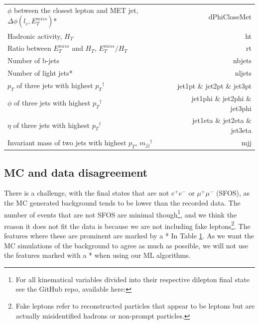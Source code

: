 \documentclass[12pt, a4paper]{book}
\begin{document}
\begin{table}[!h]
\begin{tabular}{l|r}
        $\phi$ between the closest lepton and MET jet, $\Delta\phi(l_c,E_T^{miss})$*    & dPhiCloseMet \\
        Hadronic activity, $H_T$                                                        & ht\\
        Ratio between $E_T^{miss}$ and $H_T$, $E_T^{miss}/H_T$                          & rt\\
        Number of b-jets                                                                & nbjets         \\
        Number of light jets*                                                           & nljets         \\
        $p_T$ of three jets with highest $p_T$$^\dagger$                                & jet1pt \& jet2pt \& jet3pt\\
        $\phi$ of three jets with highest $p_T$$^\dagger$                               & jet1phi \& jet2phi \& jet3phi\\
        $\eta$ of three jets with highest $p_T$$^\dagger$                               & jet1eta \& jet2eta \& jet3eta\\
        Invariant mass of two jets with highest $p_T$, $m_{jj}$$^\dagger$               & mjj\\\midrule\midrule
    \end{tabular}
    \label{tab:variables}
\end{table}

\subsection{MC and data disagreement}\label{sec:star}
There is a challenge, with the final states that are not $e^+e^-$ or $\mu^+\mu^-$ (SFOS), as the MC generated background tends to be lower than the recorded data. The number of events that are not SFOS are minimal though\footnote{For all kinematical variables divided into their respective dilepton final state see the GitHub repo, available here: }, 
and we think the reason it does not fit the data is because we are not including fake leptons\footnote{Fake leptons refer to reconstructed particles that appear to be leptons but are actually misidentified hadrons or non-prompt particles.}. The features where these are prominent are marked by a * In Table \ref{tab:variables}. As we want the MC simulations of the background to agree as much as possible, we will not use the features marked with a * when using our ML algorithms.
\end{document}
